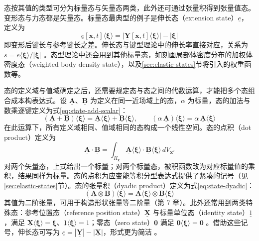 态按其值的类型可分为标量态与矢量态两类，此外还可通过张量积得到张量值态。变形态与力态都是矢量态。标量态最典型的例子是伸长态（extension state）$\underline{e}$，定义为
\begin{equation}
  \underline{e}[\mathbf{x},t]\langle\boldsymbol{\xi}\rangle=\bigl|\underline{\mathbf{Y}}[\mathbf{x},t]\langle\boldsymbol{\xi}\rangle\bigr|-|\boldsymbol{\xi}|
  \label{eq:extension-state}
\end{equation}
即变形后键长与参考键长之差。伸长态与键型理论中的伸长率直接对应，关系为 $s=\underline{e}\langle\boldsymbol{\xi}\rangle/|\boldsymbol{\xi}|$ \cite{Silling2007}。态型理论中还会用到其他标量态，如刻画局部体密度分布的加权体密度态（weighted body density state）\cite{Silling2010,SillingLehoucq2010}，以及\ref{sec:elastic-states}节将引入的权重函数等。

态的定义域与值域确定之后，还需要规定态与态之间的代数运算，才能把多个态组合成本构表达式。设 $\underline{\mathbf{A}}$、$\underline{\mathbf{B}}$ 为定义在同一近场域上的态，$\alpha$ 为标量，态的加法与数乘逐键定义为式\eqref{eq:state-add-scalar}：
\begin{equation}
  (\underline{\mathbf{A}}+\underline{\mathbf{B}})\langle\boldsymbol{\xi}\rangle=\underline{\mathbf{A}}\langle\boldsymbol{\xi}\rangle+\underline{\mathbf{B}}\langle\boldsymbol{\xi}\rangle,\qquad
  (\alpha\,\underline{\mathbf{A}})\langle\boldsymbol{\xi}\rangle=\alpha\,\underline{\mathbf{A}}\langle\boldsymbol{\xi}\rangle
  \label{eq:state-add-scalar}
\end{equation}
在此运算下，所有定义域相同、值域相同的态构成一个线性空间。态的点积（dot product）定义为
\begin{equation}
  \underline{\mathbf{A}}\cdot\underline{\mathbf{B}}=\int_{H_{\mathbf{x}}}\underline{\mathbf{A}}\langle\boldsymbol{\xi}\rangle\cdot\underline{\mathbf{B}}\langle\boldsymbol{\xi}\rangle\,dV_{\mathbf{x}'}
  \label{eq:state-dot-product}
\end{equation}
对两个矢量态，上式给出一个标量；对两个标量态，被积函数改为对应标量值的乘积，结果同样为标量。态的点积为应变能等积分型表达式提供了紧凑的记号（见 \ref{sec:elastic-states}节）。态的张量积（dyadic product）定义为式\eqref{eq:state-dyadic}：
\begin{equation}
  (\underline{\mathbf{A}}\otimes\underline{\mathbf{B}})\langle\boldsymbol{\xi}\rangle=\underline{\mathbf{A}}\langle\boldsymbol{\xi}\rangle\otimes\underline{\mathbf{B}}\langle\boldsymbol{\xi}\rangle
  \label{eq:state-dyadic}
\end{equation}
其值为二阶张量，可用于构造形状张量等二阶量（第 7 章）。此外还常用到两类特殊态：参考位置态（reference position state）$\underline{\mathbf{X}}$ 与标量单位态（identity state）$\underline{1}$，满足 $\underline{\mathbf{X}}\langle\boldsymbol{\xi}\rangle=\boldsymbol{\xi}$、$\underline{1}\langle\boldsymbol{\xi}\rangle=1$；零态（zero state）$\underline{\mathbf{0}}$ 满足 $\underline{\mathbf{0}}\langle\boldsymbol{\xi}\rangle=\mathbf{0}$ \cite{Silling2007}。借助这些记号，伸长态可写为 $\underline{e}=|\underline{\mathbf{Y}}|-|\underline{\mathbf{X}}|$，形式更为简洁 \cite{Silling2007,MadenciOterkus2014}。

